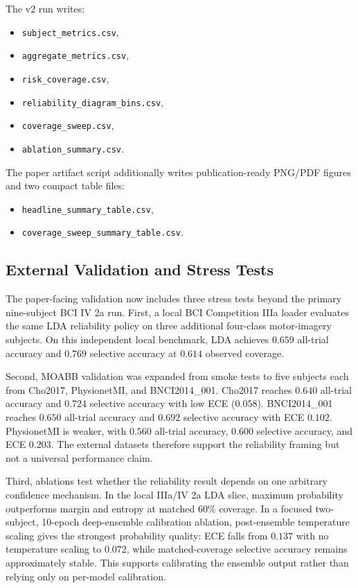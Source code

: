 \documentclass[11pt]{article}
\begin{document}
The v2 run writes:
\begin{itemize}
  \item \texttt{subject\_metrics.csv},
  \item \texttt{aggregate\_metrics.csv},
  \item \texttt{risk\_coverage.csv},
  \item \texttt{reliability\_diagram\_bins.csv},
  \item \texttt{coverage\_sweep.csv},
  \item \texttt{ablation\_summary.csv}.
\end{itemize}
The paper artifact script additionally writes publication-ready PNG/PDF
figures and two compact table files:
\begin{itemize}
  \item \texttt{headline\_summary\_table.csv},
  \item \texttt{coverage\_sweep\_summary\_table.csv}.
\end{itemize}

\subsection{External Validation and Stress Tests}

The paper-facing validation now includes three stress tests beyond the primary
nine-subject BCI IV 2a run. First, a local BCI Competition IIIa loader
evaluates the same LDA reliability policy on three additional four-class
motor-imagery subjects. On this independent local benchmark, LDA achieves
\(0.659\) all-trial accuracy and \(0.769\) selective accuracy at \(0.614\)
observed coverage.

Second, MOABB validation was expanded from smoke tests to five subjects each
from Cho2017, PhysionetMI, and BNCI2014\_001. Cho2017 reaches \(0.640\)
all-trial accuracy and \(0.724\) selective accuracy with low ECE (\(0.058\)).
BNCI2014\_001 reaches \(0.650\) all-trial accuracy and \(0.692\) selective
accuracy with ECE \(0.102\). PhysionetMI is weaker, with \(0.560\) all-trial
accuracy, \(0.600\) selective accuracy, and ECE \(0.203\). The external
datasets therefore support the reliability framing but not a universal
performance claim.

Third, ablations test whether the reliability result depends on one arbitrary
confidence mechanism. In the local IIIa/IV 2a LDA slice, maximum probability
outperforms margin and entropy at matched 60\% coverage. In a focused
two-subject, 10-epoch deep-ensemble calibration ablation, post-ensemble
temperature scaling gives the strongest probability quality: ECE falls from
\(0.137\) with no temperature scaling to \(0.072\), while matched-coverage
selective accuracy remains approximately stable. This supports calibrating
the ensemble output rather than relying only on per-model calibration.
\end{document}
